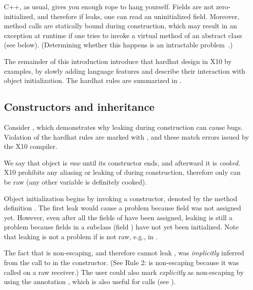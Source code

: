 \mbox{C++}, as usual, gives you enough rope to hang yourself.
Fields are not zero-initialized, and therefore if \this leaks,
    one can read an uninitialized field.
Moreover, method calls are statically bound during construction,
    which may result in an exception at runtime
    if one tries to invoke a virtual method of an abstract class (see  below).
(Determining whether this happens is an intractable problem~\cite{Gil:1998:CTA:646155.679689}.)


The remainder of this introduction introduce that
    hardhat design in X10 by examples,
    by slowly adding language features and describe their interaction with
    object initialization.
The hardhat rules are summarized in .

\subsection{Constructors and inheritance}

Consider , which demonstrates
    why leaking \this during construction can cause bugs.
Violation of the hardhat rules are marked with ,
    and these match errors issued by the X10 compiler.

We say that object is \emph{raw} until its constructor ends,
    and afterward it is \emph{cooked}.
X10 prohibits any aliasing or leaking of \this during construction,
    therefore only \this can be raw (any other variable is definitely cooked).

Object initialization begins by invoking a constructor,
    denoted by the method definition .
The first leak would cause a problem because field  was not assigned yet.
However, even after all the fields of  have been assigned,
    leaking is still a problem
    because fields in a subclass (field ) have not yet been initialized.
Note that leaking is not a problem if \this is not raw, e.g., in .

The fact that  is non-escaping, and therefore cannot leak \this,
    was \emph{implicitly} inferred from the call to 
    in the constructor.
(See Rule 2:  is non-escaping because it was called on a raw \this receiver.)
The user could also mark  \emph{explicitly} as non-escaping by using the annotation
    ,
    which is also useful for  calls (see ).

